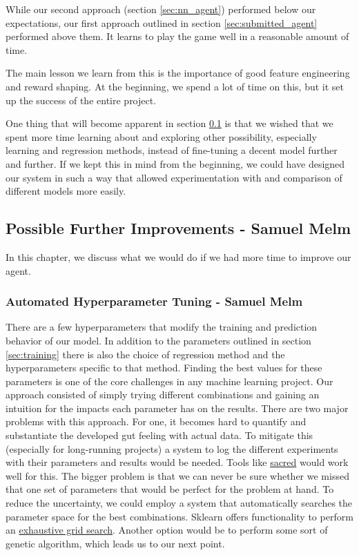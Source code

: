 \documentclass{article}
\begin{document}
While our second approach (section \ref{sec:nn_agent}) performed below our expectations, our first approach outlined in section  \ref{sec:submitted_agent} performed above them. It learns to play the game well in a reasonable amount of time.

The main lesson we learn from this is the importance of good feature engineering and reward shaping. At the beginning, we spend a lot of time on this, but it set up the success of the entire project.

One thing that will become apparent in section \ref{sec:what_to_improve} is that we wished that we spent more time learning about and exploring other possibility, especially learning and regression methods, instead of fine-tuning a decent model further and further. If we kept this in mind from the beginning, we could have designed our system in such a way that allowed experimentation with and comparison of different models more easily. 

\subsection[Possible Further Improvements]{Possible Further Improvements {\small - Samuel Melm}} \label{sec:what_to_improve}

In this chapter, we discuss what we would do if we had more time to improve our agent.

\subsubsection[Automated Hyperparameter Tuning]{Automated Hyperparameter Tuning {\small - Samuel Melm}}

There are a few hyperparameters that modify the training and prediction behavior of our model. In addition to the parameters outlined in section \ref{sec:training} there is also the choice of regression method and the hyperparameters specific to that method. Finding the best values for these parameters is one of the core challenges in any machine learning project. Our approach consisted of simply trying different combinations and gaining an intuition for the impacts each parameter has on the results. There are two major problems with this approach. For one, it becomes hard to quantify and substantiate the developed gut feeling with actual data. To mitigate this (especially for long-running projects) a system to log the different experiments with their parameters and results would be needed. Tools like \href{https://github.com/IDSIA/sacred}{sacred} would work well for this. The bigger problem is that we can never be sure whether we missed that one set of parameters that would be perfect for the problem at hand. To reduce the uncertainty, we could employ a system that automatically searches the parameter space for the best combinations. Sklearn offers functionality to perform an \href{https://scikit-learn.org/stable/modules/grid_search.html}{exhaustive grid search}. Another option would be to perform some sort of genetic algorithm, which leads us to our next point.
\end{document}
